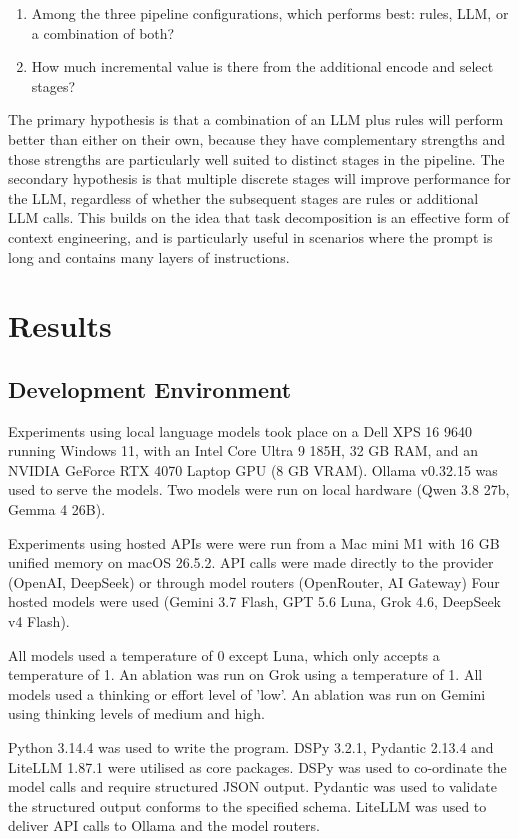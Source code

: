 \documentclass[conference]{IEEEtran}
\begin{document}
\begin{enumerate}
\item Among the three pipeline configurations, which performs
best: rules, LLM, or a combination of both?
\item How much incremental value is there from the additional
encode and select stages?
\end{enumerate}

The primary hypothesis is that a combination of an LLM
plus rules will perform better than either on their own, 
because they have complementary strengths and those 
strengths are particularly well suited to distinct stages in
the pipeline. The secondary hypothesis is that multiple 
discrete stages will improve performance for the LLM,
regardless of whether the subsequent stages are rules or 
additional LLM calls. This builds on the idea that task 
decomposition is an effective form of context engineering, 
and is particularly useful in scenarios where the prompt 
is long and contains many layers of instructions. 

\section{Results}
\subsection{Development Environment}

Experiments using local language models took place on a 
Dell XPS 16 9640 running Windows 11, with an Intel Core 
Ultra 9 185H, 32 GB RAM, and an NVIDIA GeForce RTX 
4070 Laptop GPU (8 GB VRAM). Ollama v0.32.15 was 
used to serve the models. Two models were run on local 
hardware (Qwen 3.8 27b, Gemma 4 26B). 

Experiments using hosted APIs were were run from a Mac 
mini M1 with 16 GB unified memory on macOS 26.5.2. API
calls were made directly to the provider (OpenAI, DeepSeek) 
or through model routers (OpenRouter, AI Gateway) Four 
hosted models were used (Gemini 3.7 Flash, GPT 5.6 Luna, 
Grok 4.6, DeepSeek v4 Flash). 

All models used a temperature of 0 except Luna, which only 
accepts a temperature of 1. An ablation was run on Grok 
using a temperature of 1. All models used a thinking or effort 
level of 'low'. An ablation was run on Gemini using thinking
levels of medium and high. 

Python 3.14.4 was used to write the program. DSPy 3.2.1, 
Pydantic 2.13.4 and LiteLLM 1.87.1 were utilised as core
packages. DSPy was used to co-ordinate the model calls
and require structured JSON output. Pydantic was used
to validate the structured output conforms to the specified
schema. LiteLLM was used to deliver API calls to Ollama 
and the model routers.
\end{document}
